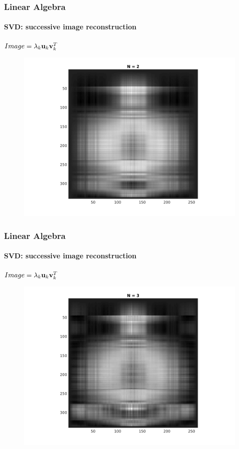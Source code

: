 \documentclass[hyperref={pdfpagelabels=true}]{beamer}
\begin{document}
\begin{frame}
\frametitle{Linear Algebra}
\framesubtitle{SVD: successive image reconstruction} 
\small{
\begin{center}
$Image = \lambda_k{\bf u}_k {\bf v}_k^T$
\end{center}}
\begin{figure}[!htb]
\centering
\includegraphics [scale=0.48]{n/b2.png}
\end{figure}
\end{frame}

\begin{frame}
\frametitle{Linear Algebra}
\framesubtitle{SVD: successive image reconstruction} 
\small{
\begin{center}
$Image = \lambda_k{\bf u}_k {\bf v}_k^T$
\end{center}}
\begin{figure}[!htb]
\centering
\includegraphics [scale=0.48]{n/b3.png}
\end{figure}
\end{frame}
\end{document}
